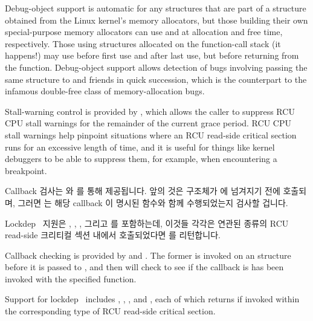Debug-object support is automatic for any  structures
that are part of a structure obtained from the Linux kernel's
memory allocators, but those building their own special-purpose
memory allocators can use  and 
at allocation and free time, respectively.
Those using  structures allocated on the function-call
stack (it happens!) may use 
before first use and  after last use,
but before returning from the function.
Debug-object support allows detection of bugs involving passing the
same  structure to  and friends in
quick succession, which is the  counterpart to the
infamous double-free class of memory-allocation bugs.

Stall-warning control is provided by , which
allows the caller to suppress RCU CPU stall warnings for the remainder
of the current grace period.
RCU CPU stall warnings help pinpoint situations where an RCU read-side
critical section runs for an excessive length of time, and it is useful
for things like kernel debuggers to be able to suppress them, for example,
when encountering a breakpoint.

\fi

Callback 검사는  와  를 통해
제공됩니다.
앞의 것은  구조체가  에 넘겨지기 전에 호출되며,
그러면  는 해당 callback 이 명시된 함수와 함께
수행되었는지 검사할 겁니다.

Lockdep~\cite{JonathanCorbet2006lockdep} 지원은
,
,
, 그리고
 를 포함하는데, 이것들 각각은 연관된 종류의 RCU
read-side 크리티컬 섹션 내에서 호출되었다면  를 리턴합니다.

\iffalse

Callback checking is provided by  and
.
The former is invoked on an  structure before it is passed
to , and then  will
check to see if the callback is has been invoked with the specified
function.

Support for lockdep~\cite{JonathanCorbet2006lockdep} includes
,
,
, and
,
each of which returns  if invoked within the corresponding
type of RCU read-side critical section.

